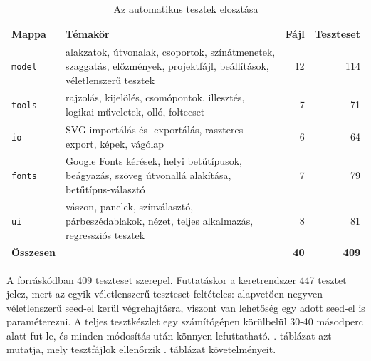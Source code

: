 \begin{table}[!htbp]
\caption{Az automatikus tesztek elosztása}
\label{tab:tests}
\centering
\footnotesize
\begin{tabular}{|l|>{\raggedright\arraybackslash}p{}|r|r|}
\hline
\textbf{Mappa} & \textbf{Témakör} & \textbf{Fájl} & \textbf{Teszteset} \\ \hline
\texttt{model} & alakzatok, útvonalak, csoportok, színátmenetek, szaggatás, előzmények, projektfájl, beállítások, véletlenszerű tesztek & 12 & 114 \\ \hline
\texttt{tools} & rajzolás, kijelölés, csomópontok, illesztés, logikai műveletek, olló, foltecset & 7 & 71 \\ \hline
\texttt{io} & SVG-importálás és -exportálás, raszteres export, képek, vágólap & 6 & 64 \\ \hline
\texttt{fonts} & Google Fonts kérések, helyi betűtípusok, beágyazás, szöveg útvonallá alakítása, betűtípus-választó & 7 & 79 \\ \hline
\texttt{ui} & vászon, panelek, színválasztó, párbeszédablakok, nézet, teljes alkalmazás, regressziós tesztek & 8 & 81 \\ \hline
\textbf{Összesen} & & \textbf{40} & \textbf{409} \\ \hline
\end{tabular}
\end{table}

A forráskódban 409 teszteset szerepel. Futtatáskor a keretrendszer 447 tesztet jelez, mert az egyik véletlenszerű teszteset feltételes: alapvetően negyven véletlenszerű seed-el kerül végrehajtásra, viszont van lehetőség egy adott seed-el is paraméterezni. A teljes tesztkészlet egy számítógépen körülbelül 30-40 másodperc alatt fut le, és minden módosítás után könnyen lefuttatható. . táblázat azt mutatja, mely tesztfájlok ellenőrzik . táblázat követelményeit.

